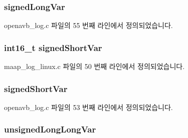 \subsubsection[{\texorpdfstring{signed\+Long\+Var}{signedLongVar}}]{ signed\+Long\+Var}\hypertarget{structlog__rt__queue__item__t_a017123d52a755c56391f021cc7d01dee}{}\label{structlog__rt__queue__item__t_a017123d52a755c56391f021cc7d01dee}


openavb\+\_\+log.\+c 파일의 55 번째 라인에서 정의되었습니다.

\subsubsection[{\texorpdfstring{signed\+Short\+Var}{signedShortVar}}]{\setlength{\rightskip}{0pt plus 5cm}int16\+\_\+t signed\+Short\+Var}\hypertarget{structlog__rt__queue__item__t_a969c99005328132f5ec57e410747d20f}{}\label{structlog__rt__queue__item__t_a969c99005328132f5ec57e410747d20f}


maap\+\_\+log\+\_\+linux.\+c 파일의 50 번째 라인에서 정의되었습니다.

\subsubsection[{\texorpdfstring{signed\+Short\+Var}{signedShortVar}}]{ signed\+Short\+Var}\hypertarget{structlog__rt__queue__item__t_abdaf892cf01ad7bbeb216839491dd80b}{}\label{structlog__rt__queue__item__t_abdaf892cf01ad7bbeb216839491dd80b}


openavb\+\_\+log.\+c 파일의 53 번째 라인에서 정의되었습니다.

\subsubsection[{\texorpdfstring{unsigned\+Long\+Long\+Var}{unsignedLongLongVar}}]{ unsigned\+Long\+Long\+Var}\hypertarget{structlog__rt__queue__item__t_ae009f33bec8f50209814033004cec38d}{}\label{structlog__rt__queue__item__t_ae009f33bec8f50209814033004cec38d}


